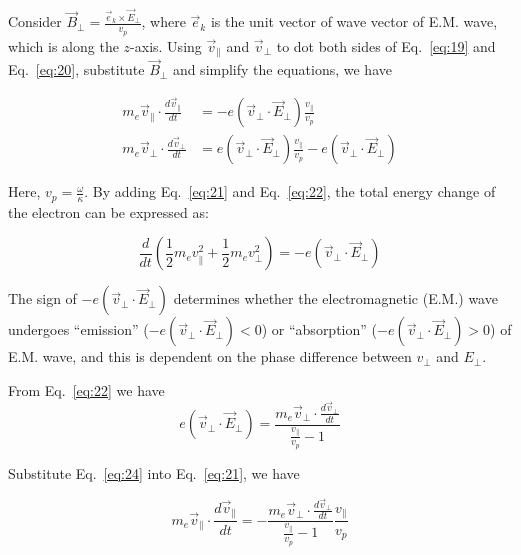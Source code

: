\documentclass{cpbtex3}
\begin{document}
Consider $\vec{B}_\perp = \frac{\vec{e}_k \times \vec{E}_\perp}{v_p}$, where $\vec{e}_k$ is the unit vector of wave vector of E.M. wave, which is along the $z$-axis. Using $\vec{v}_\parallel$ and $\vec{v}_\perp$ to dot both sides of Eq.~\eqref{eq:19} and Eq.~\eqref{eq:20}, substitute $\vec{B}_\perp$ and simplify the equations, we have

\begin{align}
m_e \vec{v}_\parallel \cdot \frac{d\vec{v}_\parallel}{dt} &= -e(\vec{v}_\perp \cdot \vec{E}_\perp) \frac{v_\parallel}{v_p} \label{eq:21} \\
m_e \vec{v}_\perp \cdot \frac{d\vec{v}_\perp}{dt} &= e(\vec{v}_\perp \cdot \vec{E}_\perp) \frac{v_\parallel}{v_p} - e(\vec{v}_\perp \cdot \vec{E}_\perp) \label{eq:22}
\end{align}

Here, \( v_p = \frac{\omega}{\kappa} \). By adding Eq.~\eqref{eq:21} and Eq.~\eqref{eq:22}, the total energy change of the electron can be expressed as:


\begin{equation}
\frac{d}{dt} \left( \frac{1}{2} m_e v_\parallel^2 + \frac{1}{2} m_e v_\perp^2 \right) = -e(\vec{v}_\perp \cdot \vec{E}_\perp) \label{eq:23}
\end{equation}

The sign of $-e(\vec{v}_\perp \cdot \vec{E}_\perp)$ determines whether the electromagnetic (E.M.) wave undergoes ``emission'' ($-e(\vec{v}_\perp \cdot \vec{E}_\perp) < 0$) or ``absorption'' ($-e(\vec{v}_\perp \cdot \vec{E}_\perp) > 0$) of E.M. wave, and this is dependent on the phase difference between $v_\perp$ and $E_\perp$.

From Eq.~\eqref{eq:22} we have
\begin{equation}
e(\vec{v}_\perp \cdot \vec{E}_\perp) = \frac{m_e \vec{v}_\perp \cdot \frac{d\vec{v}_\perp}{dt}}{\frac{v_\parallel}{v_p} - 1} \label{eq:24}
\end{equation}

Substitute Eq.~\eqref{eq:24} into Eq.~\eqref{eq:21}, we have

\begin{equation}
m_e \vec{v}_\parallel \cdot \frac{d\vec{v}_\parallel}{dt} = -\frac{m_e \vec{v}_\perp \cdot \frac{d\vec{v}_\perp}{dt}}{\frac{v_\parallel}{v_p} - 1} \frac{v_\parallel}{v_p} \label{eq:25}
\end{equation}
\end{document}

